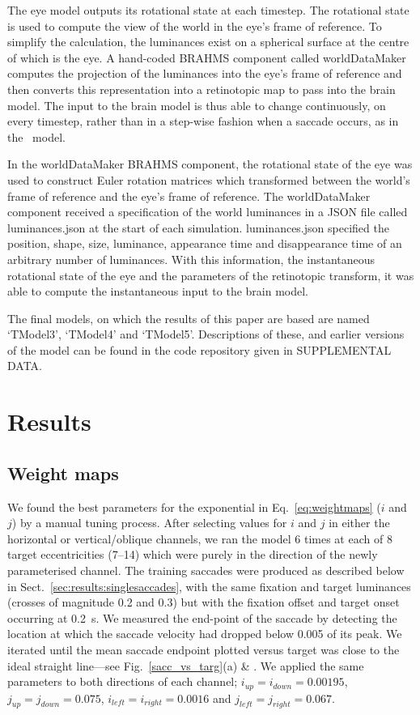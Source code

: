 \documentclass{frontiersSCNS}
\begin{document}
The eye model outputs its rotational state at each timestep. The
rotational state is used to compute the view of the world in the eye's
frame of reference. To simplify the calculation, the luminances exist
on a spherical surface at the centre of which is the eye. A hand-coded
BRAHMS component called worldDataMaker computes the projection of the
luminances into the eye's frame of reference and then converts this
representation into a retinotopic map to pass into the brain
model. The input to the brain model is thus able to change
continuously, on every timestep, rather than in a step-wise fashion
when a saccade occurs, as in the \ccg~model.

In the worldDataMaker BRAHMS component, the rotational state of the
eye was used to construct Euler rotation matrices which transformed
between the world's frame of reference and the eye's frame of
reference. The worldDataMaker component received a specification of
the world luminances in a JSON file called luminances.json at the
start of each simulation. luminances.json specified the position,
shape, size, luminance, appearance time and disappearance time of an
arbitrary number of luminances. With this information, the
instantaneous rotational state of the eye and the parameters of the
retinotopic transform, it was able to compute the instantaneous input
to the brain model.

The final models, on which the results of this paper are based are
named `TModel3', `TModel4' and `TModel5'. Descriptions of these, and
earlier versions of the model can be found in the code repository
given in SUPPLEMENTAL DATA.


\section{Results} \label{sec:results}

\subsection{Weight maps} \label{sec:results:weightmaps}

We found the best parameters for the exponential in
Eq.~\ref{eq:weightmaps} ($i$ and $j$) by a manual tuning
process. After selecting values for $i$ and $j$ in either the
horizontal or vertical/oblique channels, we ran the model 6 times at
each of 8 target eccentricities (7\dg--14\dg) which were purely in the
direction of the newly parameterised channel. The training saccades
were produced as described below in Sect.~\ref{sec:results:singlesaccades},
with the same fixation and target luminances (crosses of magnitude 0.2
and 0.3) but with the fixation offset and target onset occurring at
0.2~s. We measured the end-point of the saccade by detecting the
location at which the saccade velocity had dropped below 0.005 of its
peak. We iterated until the mean saccade endpoint plotted versus
target was close to the ideal straight line---see
Fig.~\ref{sacc_vs_targ}(a) \& . We applied the same parameters to
both directions of each channel; $i_{up} = i_{down} = 0.00195$,
$j_{up} = j_{down} = 0.075$, $i_{left} = i_{right} = 0.0016$ and
$j_{left} = j_{right} = 0.067$.
\end{document}
